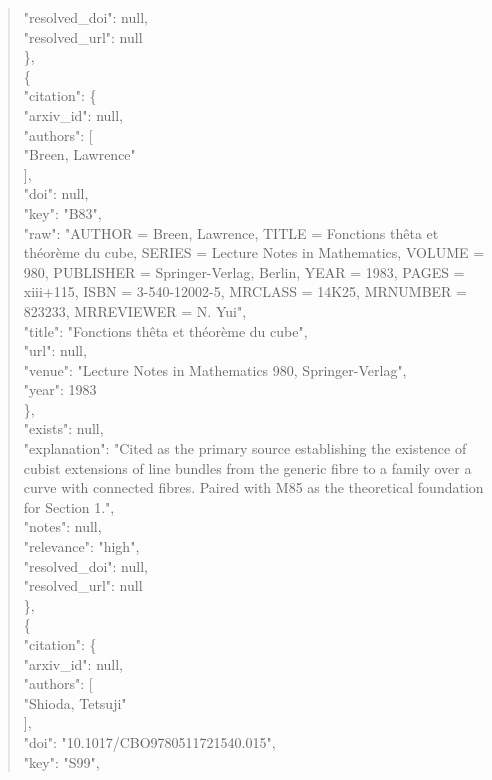 \documentclass[11pt]{article}
\begin{document}
\begin{quote}
      "resolved\_doi": null,\\
      "resolved\_url": null\\
    \},\\
    \{\\
      "citation": \{\\
        "arxiv\_id": null,\\
        "authors": [\\
          "Breen, Lawrence"\\
        ],\\
        "doi": null,\\
        "key": "B83",\\
        "raw": "AUTHOR = Breen, Lawrence, TITLE = Fonctions thêta et théorème du cube, SERIES = Lecture Notes in Mathematics, VOLUME = 980, PUBLISHER = Springer-Verlag, Berlin, YEAR = 1983, PAGES = xiii+115, ISBN = 3-540-12002-5, MRCLASS = 14K25, MRNUMBER = 823233, MRREVIEWER = N. Yui",\\
        "title": "Fonctions thêta et théorème du cube",\\
        "url": null,\\
        "venue": "Lecture Notes in Mathematics 980, Springer-Verlag",\\
        "year": 1983\\
      \},\\
      "exists": null,\\
      "explanation": "Cited as the primary source establishing the existence of cubist extensions of line bundles from the generic fibre to a family over a curve with connected fibres. Paired with M85 as the theoretical foundation for Section 1.",\\
      "notes": null,\\
      "relevance": "high",\\
      "resolved\_doi": null,\\
      "resolved\_url": null\\
    \},\\
    \{\\
      "citation": \{\\
        "arxiv\_id": null,\\
        "authors": [\\
          "Shioda, Tetsuji"\\
        ],\\
        "doi": "10.1017/CBO9780511721540.015",\\
        "key": "S99",\\

\end{quote}
\end{document}
